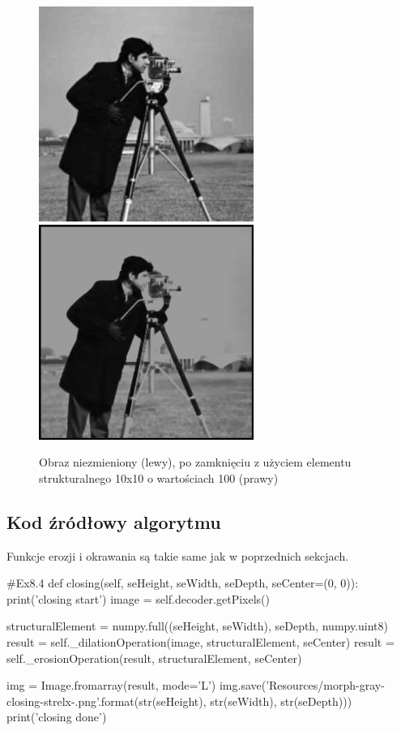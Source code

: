 \documentclass[a4paper,12pt]{book}
\begin{document}
\begin{figure}[H]
	\caption{Obraz niezmieniony (lewy), po zamknięciu z użyciem elementu strukturalnego 10x10 o wartościach 100 (prawy)}
	\includegraphics[width=7cm, height=7cm]{man-unmodified.jpg}
	\includegraphics[width=7cm, height=7cm]{morph-gray-closing-strel10x10-100.png}
\end{figure}
\subsection{Kod źródłowy algorytmu}
Funkcje erozji i okrawania są takie same jak w poprzednich sekcjach. 
\begin{python}
#Ex8.4
def closing(self, seHeight, seWidth, seDepth, seCenter=(0, 0)):
	print('closing start')
	image = self.decoder.getPixels()
	
	structuralElement = numpy.full((seHeight, seWidth), seDepth, numpy.uint8)
	result = self._dilationOperation(image, structuralElement, seCenter)
	result = self._erosionOperation(result, structuralElement, seCenter)
	
	img = Image.fromarray(result, mode='L')
	img.save('Resources/morph-gray-closing-strel{}x{}-{}.png'.format(str(seHeight), str(seWidth), str(seDepth)))
	print('closing done')
\end{python}
\end{document}
